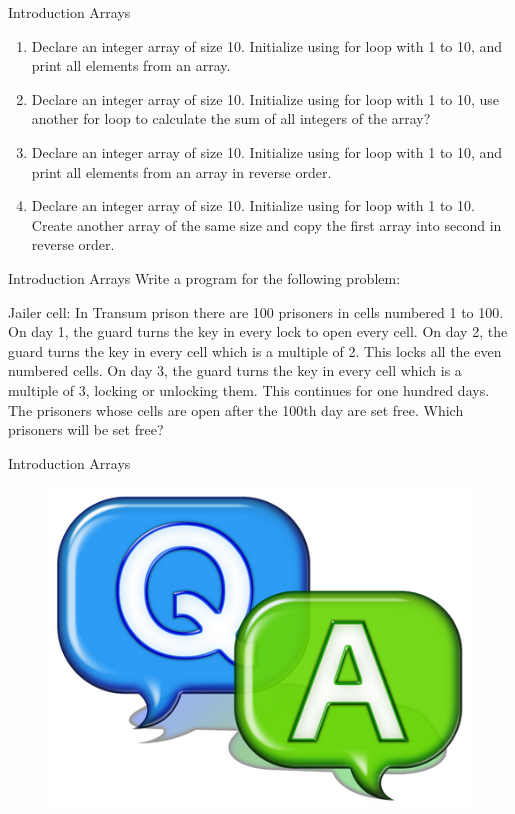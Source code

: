 \documentclass[14pt]{beamer}
\begin{document}
\begin{frame}{Introduction Arrays}
\small
\begin{enumerate}
\item Declare an integer array of size 10. Initialize using for loop with 1 to 10, and print all elements from an array.

\item Declare an integer array of size 10. Initialize using for loop with 1 to 10, use another for loop to calculate the sum of all integers of the array?

\item Declare an integer array of size 10. Initialize using for loop with 1 to 10, and print all elements from an array in reverse order.

\item Declare an integer array of size 10. Initialize using for loop with 1 to 10. Create another array of the same size and copy the first array into second in reverse order.

\end{enumerate}
\end{frame}

\begin{frame}{Introduction Arrays}
\small
Write a program for the following problem:

Jailer cell:
In Transum prison there are 100 prisoners in cells numbered 1 to 100.
On day 1, the guard turns the key in every lock to open every cell.
On day 2, the guard turns the key in every cell which is a multiple of 2. This locks all the even numbered cells.
On day 3, the guard turns the key in every cell which is a multiple of 3, locking or unlocking them.
This continues for one hundred days. The prisoners whose cells are open after the 100th day are set free.
Which prisoners will be set free? 
\end{frame}

\begin{frame}{Introduction Arrays}
\begin{figure}[H]
 \begin{center}
   \includegraphics[scale=.3]{qa.png}   
 \end{center}
  \end{figure}
\end{frame}
\end{document}
